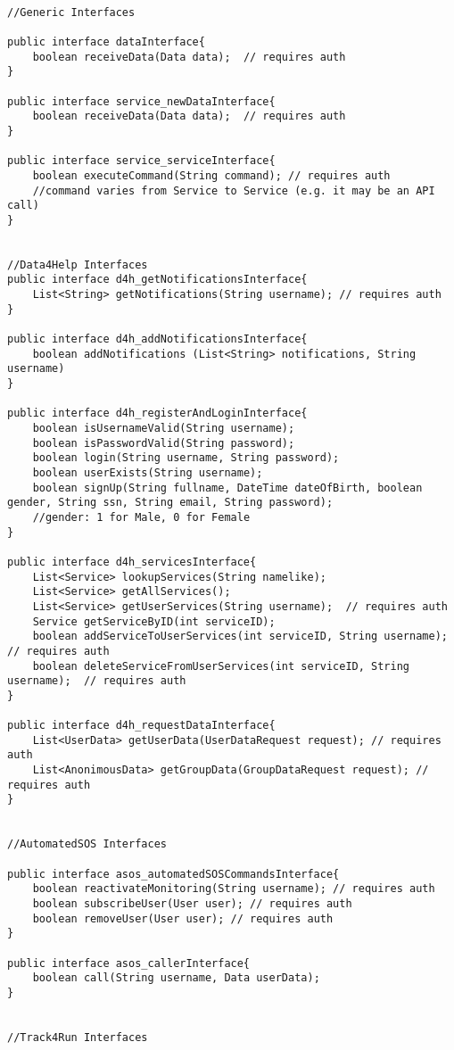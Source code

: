 \documentclass[../../DD.tex]{subfiles}
\begin{document}
\begin{lstlisting}

//Generic Interfaces

public interface dataInterface{
	boolean receiveData(Data data);  // requires auth
}

public interface service_newDataInterface{
	boolean receiveData(Data data);  // requires auth
}

public interface service_serviceInterface{
	boolean executeCommand(String command);	// requires auth
	//command varies from Service to Service (e.g. it may be an API call) 
}


//Data4Help Interfaces
public interface d4h_getNotificationsInterface{
	List<String> getNotifications(String username);	// requires auth
}

public interface d4h_addNotificationsInterface{
	boolean addNotifications (List<String> notifications, String username)
}

public interface d4h_registerAndLoginInterface{
	boolean isUsernameValid(String username);
	boolean isPasswordValid(String password);
	boolean login(String username, String password);
	boolean userExists(String username);
	boolean signUp(String fullname, DateTime dateOfBirth, boolean gender, String ssn, String email, String password);
	//gender: 1 for Male, 0 for Female
}

public interface d4h_servicesInterface{
	List<Service> lookupServices(String namelike);
	List<Service> getAllServices();
	List<Service> getUserServices(String username);  // requires auth
	Service getServiceByID(int serviceID);
	boolean addServiceToUserServices(int serviceID, String username);  // requires auth
	boolean deleteServiceFromUserServices(int serviceID, String username);  // requires auth
}

public interface d4h_requestDataInterface{
	List<UserData> getUserData(UserDataRequest request); // requires auth
	List<AnonimousData> getGroupData(GroupDataRequest request); // requires auth
}


//AutomatedSOS Interfaces

public interface asos_automatedSOSCommandsInterface{
	boolean reactivateMonitoring(String username); // requires auth
	boolean subscribeUser(User user); // requires auth
	boolean removeUser(User user); // requires auth
}

public interface asos_callerInterface{
	boolean call(String username, Data userData);
}


//Track4Run Interfaces


\end{lstlisting}
\end{document}
